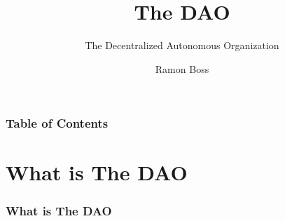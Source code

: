 \documentclass{beamer}
\begin{document}
\title{The DAO}
\subtitle{The Decentralized Autonomous Organization}
\author{Ramon Boss}

\frame{\titlepage}

\begin{frame}
  \frametitle{Table of Contents}
  \tableofcontents
\end{frame}

\section{What is The DAO}

\begin{frame}
\frametitle{What is The DAO}
\end{frame}
\end{document}

